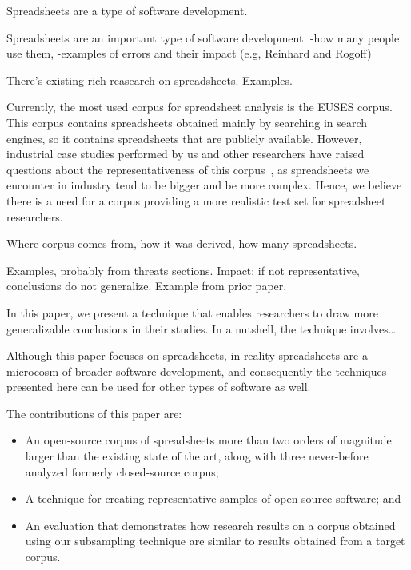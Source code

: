 \documentclass[conference]{IEEEtran}
\begin{document}
Spreadsheets are a type of software development.

Spreadsheets are an important type of software development.
-how many people use them,
-examples of errors and their impact (e.g, Reinhard and Rogoff)

There's existing rich-reasearch on spreadsheets.
Examples.

Currently, the most used corpus for spreadsheet analysis is the EUSES corpus.
This corpus contains spreadsheets obtained mainly by searching in search
engines, so it contains spreadsheets that are publicly available. However,
industrial case studies performed by us and other researchers have raised
questions about the representativeness of this corpus~\cite{something}, as spreadsheets we 
encounter in industry tend to be bigger and be more complex. Hence, we believe
there is a need for a corpus providing a more realistic test set for spreadsheet
researchers.

Where corpus comes from, how it was derived, how many spreadsheets.


Examples, probably from threats sections.
Impact: if not representative, conclusions do not generalize.
Example from prior paper.

In this paper, we present a technique that enables researchers
to draw more generalizable conclusions in their studies.
In a nutshell, the technique involves\ldots

Although this paper focuses on spreadsheets, in reality 
spreadsheets are a microcosm of broader software development,
and consequently the techniques presented here can be used for other 
types of software as well.

The contributions of this paper are:

\begin{itemize}
  \item An open-source corpus of spreadsheets more than two orders of magnitude larger
 		than the existing state of the art, along with three never-before analyzed
 		formerly closed-source corpus;
  \item A technique for creating representative samples of open-source
  		software; and
  \item An evaluation that demonstrates 
		how research results on a corpus obtained using our subsampling technique
		are similar to results obtained from a target corpus.
\end{itemize}
\end{document}
